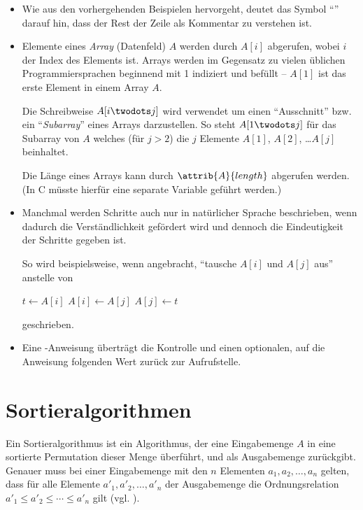 \begin{itemize}
    \item Wie aus den vorhergehenden Beispielen hervorgeht, deutet das Symbol \enquote{\Comment} darauf hin, dass der Rest der Zeile als Kommentar zu verstehen ist.
    
    \item Elemente eines \emph{Array} (Datenfeld) $A$ werden durch $A[i]$ abgerufen, wobei $i$ der Index des Elements ist. Arrays werden im Gegensatz zu vielen üblichen Pro\-grammier\-sprachen beginnend mit 1 indiziert und befüllt -- $A[1]$ ist das erste Element in einem Array $A$.
    
    Die Schreibweise $A[i \twodots j]$ wird verwendet um einen \enquote{Ausschnitt} bzw. ein \enquote{\emph{Subarray}} eines Arrays darzustellen. So steht $A[1 \twodots j]$ für das Subarray von $A$ welches (für $j > 2$) die $j$ Elemente $A[1]$, $A[2]$, \ldots $A[j]$ beinhaltet.
    
    Die Länge eines Arrays kann durch $\attrib{A}{length}$ abgerufen werden. (In C müsste hierfür eine separate Variable geführt werden.)

    \item Manchmal werden Schritte auch nur in natürlicher Sprache beschrieben, wenn dadurch die Verständlichkeit gefördert wird und dennoch die Eindeutigkeit der Schritte gegeben ist.

    So wird beispielsweise, wenn angebracht, \enquote{tausche $A[i]$ und $A[j]$ aus} anstelle von
    \begin{codebox}
        \li $t \gets A[i]$
        \li $A[i] \gets A[j]$
        \li $A[j] \gets t$
    \end{codebox}
    geschrieben.
    
    \item Eine \Return-Anweisung überträgt die Kontrolle und einen optionalen, auf die Anweisung folgenden Wert zurück zur Aufrufstelle.

\end{itemize}

\section{Sortieralgorithmen}
\label{sec:sorting-algorithms-definition}

Ein Sortieralgorithmus ist ein Algorithmus, der eine Eingabemenge $A$ in eine sortierte Permutation dieser Menge überführt, und als Ausgabemenge zurückgibt. Genauer muss bei einer Eingabemenge mit den $n$ Elementen $a_1, a_2, \ldots, a_n$ gelten, dass für alle Elemente $a'_1, a'_2, \ldots, a'_n$ der Ausgabemenge die Ordnungsrelation $a'_1 \leq a'_2 \leq \cdots \leq a'_n$ gilt (vgl. \cite[4]{taocp3}).

